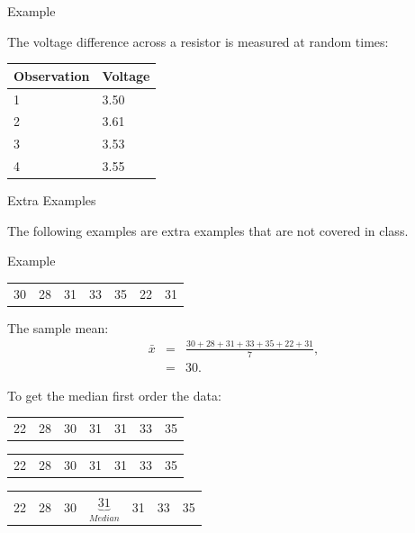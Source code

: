 \begin{frame}{Example}

  The voltage difference across a resistor is measured at random
  times: \\ [10pt]
  \begin{tabular}{l|l}
    Observation & Voltage \\ \hline
    1 & 3.50 \\
    2 & 3.61 \\
    3 & 3.53 \\
    4 & 3.55 
  \end{tabular}
  
\end{frame}

\begin{frame}{Extra Examples}

  \vfill

  The following examples are extra examples that are not covered in
  class.

  \vfill
  
\end{frame}

\begin{frame}{Example}

  \begin{tabular}{lllllll}
    30 & 28 & 31 & 33 & 35 & 22 & 31
  \end{tabular}

  The sample mean:
  \begin{eqnarray*}
    \bar{x} & = & \frac{30 + 28 + 31 + 33 + 35 + 22 + 31}{7}, \\
    & = & 30.
  \end{eqnarray*}

  To get the median first order the data: \\
  {
    \begin{tabular}{lllllll}
      22 & 28 & 30 & 31 & 31 & 33 & 35
    \end{tabular}
  }

  {
    \begin{tabular}{lllllll}
      {\color{red}22} & {\color{red}28} & {\color{red}30} & 31 & {\color{blue}31} & {\color{blue}33} & {\color{blue}35}
    \end{tabular}
  }

  {
    \begin{tabular}{lllllll}
      {\color{red}22} & {\color{red}28} & {\color{red}30} & $\underbrace{31}_{Median}$ & {\color{blue}31} & {\color{blue}33} & {\color{blue}35}
    \end{tabular}
  }
  
\end{frame}


